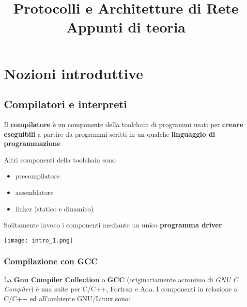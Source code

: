 

\title{%
Protocolli e Architetture di Rete\\
\large Appunti di teoria}


\maketitle
\tableofcontents
\newpage
\section{Nozioni introduttive}
\subsection{Compilatori e interpreti}

Il \textbf{compilatore} \`e un componente della toolchain di programmi usati per \textbf{creare eseguibili} a partire da programmi scritti in un qualche \textbf{linguaggio di programmazione}

\begin{minipage}[c]{.65\textwidth}
Altri componenti della toolchain sono
\begin{itemize}
  \item precompilatore
  \item assemblatore
  \item linker (statico e dinamico)
\end{itemize}

Solitamente invoco i componenti mediante un unico \textbf{programma driver}
\end{minipage}
\noindent\begin{minipage}[c]{.35\textwidth}
\texttt{[image: intro\_1.png]}
\end{minipage}

\subsubsection{Compilazione con GCC}

La \textbf{Gnu Compiler Collection} o \textbf{GCC} (originariamente acronimo di \textit{GNU C Compiler}) \`e una suite per C/C++, Fortran e Ada. I componenti in relazione a C/C++ ed all'ambiente GNU/Linux sono:

\begin{center}
\end{center}

